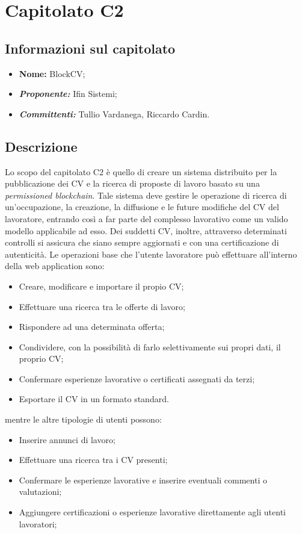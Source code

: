 \section{Capitolato C2}
\subsection{Informazioni sul capitolato}
	\begin{itemize}
		\item \textbf{Nome:}
		BlockCV;
		\item \textbf{\textit{Proponente:}}
		Ifin Sistemi;
		\item \textbf{\textit{Committenti:}}
		Tullio Vardanega, Riccardo Cardin.
	\end{itemize}

\subsection{Descrizione}
	Lo scopo del capitolato C2 è quello di creare un sistema distribuito per la pubblicazione dei CV e la ricerca di proposte di lavoro basato su una \textit{permissioned blockchain}. Tale sistema deve gestire le operazione di ricerca di un'occupazione, la creazione, la diffusione e le future modifiche del CV del lavoratore, entrando così a far parte del complesso lavorativo come un valido modello applicabile ad esso. Dei suddetti CV, inoltre, attraverso determinati controlli si assicura che siano sempre aggiornati e con una certificazione di autenticità.
	\newline \newline Le operazioni base che l'utente lavoratore può effettuare all'interno della web application sono:
	\begin{itemize}
		\item Creare, modificare e importare il propio CV;
		\item Effettuare una ricerca tra le offerte di lavoro;
		\item Rispondere ad una determinata offerta;
		\item Condividere, con la possibilità di farlo selettivamente sui propri dati, il proprio CV;
		\item Confermare esperienze lavorative o certificati assegnati da terzi;
		\item Esportare il CV in un formato standard.
	\end{itemize}
	mentre le altre tipologie di utenti possono:
	\begin{itemize}
		\item Inserire annunci di lavoro;
		\item Effettuare una ricerca tra i CV presenti;
		\item Confermare le esperienze lavorative e inserire eventuali commenti o valutazioni;
		\item Aggiungere certificazioni o esperienze lavorative direttamente agli utenti lavoratori;
	\end{itemize}

